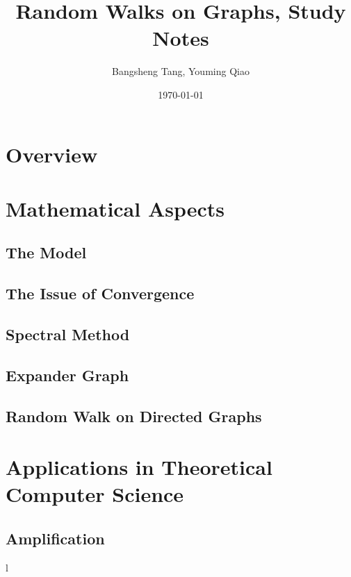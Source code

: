 \documentclass[11pt]{report}
\begin{document}
\title{Random Walks on Graphs, Study Notes}
\author{Bangsheng Tang, Youming Qiao}
\date{\today}
\maketitle \tableofcontents

\chapter{Overview}


\chapter{Mathematical Aspects}

\section{The Model}



\section{The Issue of Convergence}


\section{Spectral Method}


\section{Expander Graph}


\section{Random Walk on Directed Graphs}


\chapter{Applications in Theoretical Computer Science}

\section{Amplification}


%
l
%

%

%


\end{document}
